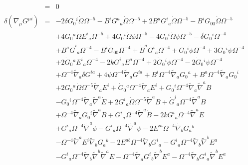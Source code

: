 \begin{eqnarray}
&=&0
\\  \nonumber\\ 
\delta(\nabla_\mu G^{\mu i})&=& -2 \delta G_{0}{}^{i} \dot{\Omega} \Omega^{-5} -  B^{i} G^{a}{}_{a} \dot{\Omega} \Omega^{-5} + 2 B^{a} G^{i}{}_{a} \dot{\Omega} \Omega^{-5} -  B^{i} G_{00}{} \dot{\Omega} \Omega^{-5} 
\nonumber\\
&&+ 4 G_{0}{}^{a} \dot{\Omega} E^{i}{}_{a} \Omega^{-5} + 4 G_{0}{}^{i} \dot{\Omega} \phi \Omega^{-5} - 4 G_{0}{}^{i} \dot{\Omega} \psi \Omega^{-5} -  \dot{\delta G}_{0}{}^{i} \Omega^{-4} 
\nonumber\\
&&+ B^{a} \dot{G}^{i}{}_{a} \Omega^{-4} -  B^{i} \dot{G}_{00}{} \Omega^{-4} + \dot{B}^{a} G^{i}{}_{a} \Omega^{-4}+ G_{0}{}^{i} \dot{\phi} \Omega^{-4} + 3 G_{0}{}^{i} \dot{\psi} \Omega^{-4}
\nonumber\\
&& + 2 \dot{G}_{0}{}^{a} E^{i}{}_{a} \Omega^{-4} - 2 k G^{i}{}_{a} E^{a} \Omega^{-4} + 2 \dot{G}_{0}{}^{i} \phi \Omega^{-4} - 2 \dot{G}_{0}{}^{i} \psi \Omega^{-4}  
\nonumber\\
&&+ \Omega^{-4} \tilde{\nabla}_{a}\delta G^{ia} + 4 \psi \Omega^{-4} \tilde{\nabla}_{a}G^{ia} + B^{i} \Omega^{-4} \tilde{\nabla}_{a}G_{0}{}^{a} + B^{a} \Omega^{-4} \tilde{\nabla}_{a}G_{0}{}^{i} 
\nonumber\\
&&+ 2 G_{0}{}^{a} \dot{\Omega} \Omega^{-5} \tilde{\nabla}_{a}E^{i} + \dot{G}_{0}{}^{a} \Omega^{-4} \tilde{\nabla}_{a}E^{i} + G_{0}{}^{i} \Omega^{-4} \tilde{\nabla}_{a}\tilde{\nabla}^{a}B 
\nonumber\\
&&-  G_{0}{}^{i} \Omega^{-4} \tilde{\nabla}_{a}\tilde{\nabla}^{a}\dot{E} + 2 G^{i}{}_{a} \dot{\Omega} \Omega^{-5} \tilde{\nabla}^{a}B + \dot{G}^{i}{}_{a} \Omega^{-4} \tilde{\nabla}^{a}B \nonumber \\ 
&& + \Omega^{-4} \tilde{\nabla}_{a}G_{0}{}^{i} \tilde{\nabla}^{a}B + G^{i}{}_{a} \Omega^{-4} \tilde{\nabla}^{a}\dot{B} - 2 k G^{i}{}_{a} \Omega^{-4} \tilde{\nabla}^{a}E 
\nonumber\\
&&+ G^{i}{}_{a} \Omega^{-4} \tilde{\nabla}^{a}\phi 
-  G^{i}{}_{a} \Omega^{-4} \tilde{\nabla}^{a}\psi - 2 E^{ia} \Omega^{-4} \tilde{\nabla}_{b}G_{a}{}^{b} 
\nonumber\\
&&-  \Omega^{-4} \tilde{\nabla}^{a}E^{i} \tilde{\nabla}_{b}G_{a}{}^{b} 
- 2 E^{ab} \Omega^{-4} \tilde{\nabla}_{b}G^{i}{}_{a} -  G^{i}{}_{a} \Omega^{-4} \tilde{\nabla}_{b}\tilde{\nabla}^{b}E^{a}  
\nonumber\\
&&-  G^{i}{}_{a} \Omega^{-4} \tilde{\nabla}_{b}\tilde{\nabla}^{b}\tilde{\nabla}^{a}E 
-  \Omega^{-4} \tilde{\nabla}_{a}G^{i}{}_{b} \tilde{\nabla}^{b}E^{a} -  \Omega^{-4} \tilde{\nabla}_{b}G^{i}{}_{a} \tilde{\nabla}^{b}E^{a} 

\end{eqnarray}
